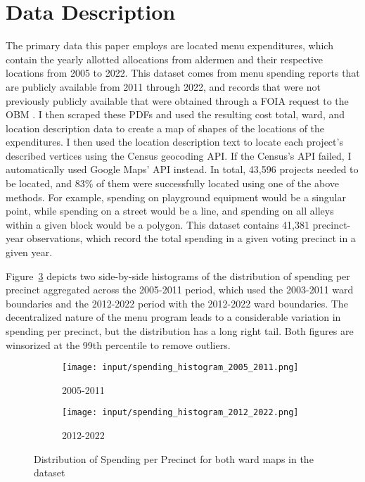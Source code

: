\section{Data Description}\label{sec:data_description}
The primary data this paper employs are located menu expenditures, which contain the yearly allotted allocations from aldermen and their respective locations from 2005 to 2022.
This dataset comes from menu spending reports that are publicly available from 2011 through 2022, and records that were not previously publicly available that were obtained through a FOIA request to the OBM \cite{OBM_datasource}.  
I then scraped these PDFs and used the resulting cost total, ward, and location description data to create a map of shapes of the locations of the expenditures.
I then used the location description text to locate each project's described vertices using the Census geocoding API. 
If the Census's API failed, I automatically used Google Maps' API instead.
In total, 43,596 projects needed to be located, and 83\% of them were successfully located using one of the above methods.
For example, spending on playground equipment would be a singular point, while spending on a street would be a line, and spending on all alleys within a given block would be a polygon.
This dataset contains 41,381 precinct-year observations, which record the total spending in a given voting precinct in a given year.

Figure~\ref{fig:spending_hist} depicts two side-by-side histograms of the distribution of spending per precinct aggregated across the 2005-2011 period, which used the 2003-2011 ward boundaries and the 2012-2022 period with the 2012-2022 ward boundaries.
The decentralized nature of the menu program leads to a considerable variation in spending per precinct, but the distribution has a long right tail.
Both figures are winsorized at the 99th percentile to remove outliers.

\begin{figure}[H]
    \centering
    \begin{subfigure}[b]{0.45\textwidth} %
      \texttt{[image: input/spending\_histogram\_2005\_2011.png]}
      \caption{2005-2011}
      \label{fig:sub1}
    \end{subfigure}
    \hfill %
    \begin{subfigure}[b]{0.45\textwidth}
      \texttt{[image: input/spending\_histogram\_2012\_2022.png]}
      \caption{2012-2022}
      \label{fig:sub2}
    \end{subfigure}
  
    \caption{Distribution of Spending per Precinct for both ward maps in the dataset}
    \label{fig:spending_hist}
  \end{figure}

